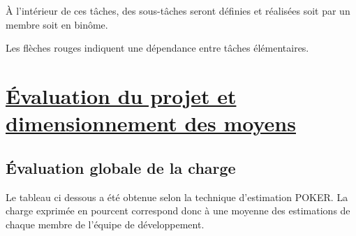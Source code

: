 \documentclass{../res/univ-projet}
\begin{document}
\`{A} l'intérieur de ces tâches, des sous-tâches seront définies et réalisées soit par un membre soit en binôme.

Les flèches rouges indiquent une dépendance entre tâches élémentaires.
\newpage
\section{\underline{Évaluation du projet et dimensionnement des moyens}}
\subsection{Évaluation globale de la charge}

Le tableau ci dessous a été obtenue selon la technique d'estimation POKER. La charge exprimée en pourcent correspond donc à une moyenne des estimations de chaque membre 
de l'équipe de développement.
\end{document}
